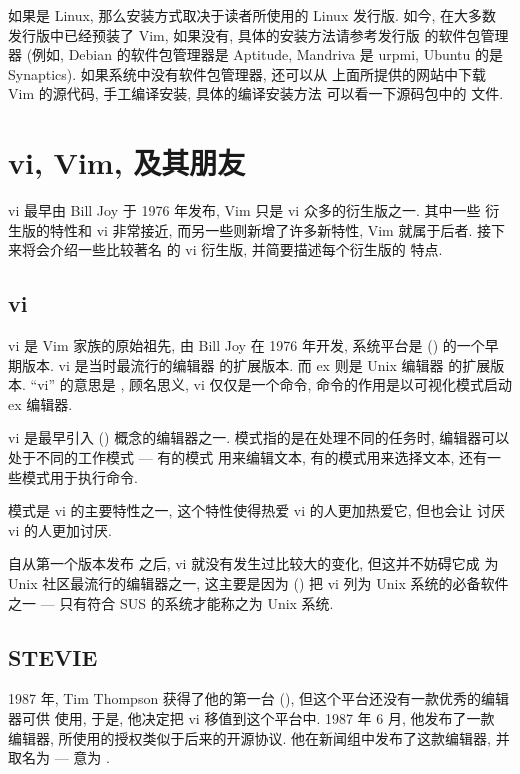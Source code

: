 如果是 Linux, 那么安装方式取决于读者所使用的 Linux 发行版. 如今, 在大多数
发行版中已经预装了 Vim, 如果没有, 具体的安装方法请参考发行版
的软件包管理器 (例如, Debian 的软件包管理器是 Aptitude, Mandriva 是
urpmi, Ubuntu 的是 Synaptics). 如果系统中没有软件包管理器, 还可以从
上面所提供的网站中下载 Vim 的源代码, 手工编译安装, 具体的编译安装方法
可以看一下源码包中的  文件.

\section{vi, Vim, 及其朋友}
\label{sec:vi_vim_and_friends}
vi 最早由 Bill Joy 于 1976 年发布, Vim 只是 vi 众多的衍生版之一. 其中一些
衍生版的特性和 vi 非常接近, 而另一些则新增了许多新特性, Vim 就属于后者.
接下来将会介绍一些比较著名 的 vi 衍生版, 并简要描述每个衍生版的
特点.
\subsection{vi}
\label{subsec:vi}
vi 是 Vim 家族的原始祖先, 由 Bill Joy 在 1976 年开发, 系统平台是
 () 的一个早期版本.
vi 是当时最流行的编辑器  的扩展版本. 而 ex 则是 Unix 编辑器
 的扩展版本. ``vi'' 的意思是 ,
顾名思义, vi 仅仅是一个命令, 命令的作用是以可视化模式启动 ex
编辑器.

vi 是最早引入 () 概念的编辑器之一.
模式指的是在处理不同的任务时, 编辑器可以处于不同的工作模式 --- 有的模式
用来编辑文本, 有的模式用来选择文本, 还有一些模式用于执行命令.

模式是 vi 的主要特性之一, 这个特性使得热爱 vi 的人更加热爱它, 但也会让
讨厌 vi 的人更加讨厌.

自从第一个版本发布 之后, vi 就没有发生过比较大的变化, 但这并不妨碍它成
为 Unix 社区最流行的编辑器之一, 这主要是因为  () 把 vi 列为 Unix 系统的必备软件之一 --- 只有符合
SUS 的系统才能称之为 Unix 系统.

\subsection{STEVIE}
\label{subsec:stevie}
1987 年, Tim Thompson 获得了他的第一台 
(), 但这个平台还没有一款优秀的编辑器可供
使用, 于是, 他决定把 vi 移值到这个平台中. 1987 年 6 月, 他发布了一款
编辑器, 所使用的授权类似于后来的开源协议. 他在新闻组中发布了这款编辑器,
并取名为  --- 意为 .

